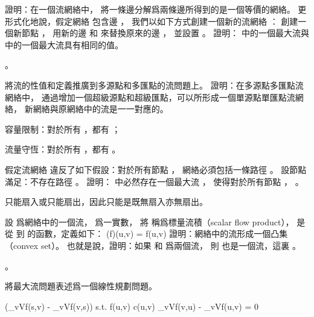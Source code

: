 \startsection[
  title={Flow networks},
  reference=section:flow_networks,
]

\startEXERCISE
證明：在一個流網絡中，
將一條邊分解爲兩條邊所得到的是一個等價的網絡。
更形式化地說，假定網絡  包含邊 ，
我們以如下方式創建一個新的流網絡 ：
創建一個新節點 ，
用新的邊  和  來替換原來的邊 ，
並設置 。
證明：  中的一個最大流與  中的一個最大流具有相同的值。
\stopEXERCISE

\startANSWER
{}。
\stopANSWER

\startEXERCISE
將流的性值和定義推廣到多源點和多匯點的流問題上。
證明：在多源點多匯點流網絡中，
通過增加一個超級源點和超級匯點，可以所形成一個單源點單匯點流網絡，
新網絡與原網絡中的流是一一對應的。
\stopEXERCISE

\startANSWER
容量限制：對於所有 ，都有 ；

流量守恆：對於所有 ，都有 。
\stopANSWER

\startEXERCISE
假定流網絡  違反了如下假設：對於所有節點 ，
網絡必須包括一條路徑 。
設節點  滿足：不存在路徑 。
證明：  中必然存在一個最大流 ，
使得對於所有節點 ， 。
\stopEXERCISE

\startANSWER
{} 只能扇入或只能扇出，因此只能是既無扇入亦無扇出。
\stopANSWER

\startEXERCISE
設  爲網絡中的一個流， \m{\alpha} 爲一實數，
將  稱爲{\EMP 標量流積（scalar flow product）}，
是從  到  的函數，定義如下：
\startformula
(\alpha f)(u,v) = \alpha \cdot f(u,v)
\stopformula
證明：網絡中的流形成一個{\EMP 凸集（convex set）}。
也就是說，證明：如果  和  爲兩個流，
則  也是一個流，這裏 。
\stopEXERCISE

\startANSWER
{}。
\stopANSWER

\startEXERCISE
將最大流問題表述爲一個線性規劃問題。
\stopEXERCISE

\startANSWER
\startformula\startmathalignment
\NC \max \NC (\sum_{v\in V}f(s,v) - \sum_{v\in V}f(v,s)) \NR
\NC s.t. \le f(u,v) \le c(u,v) \NR
\NC \NC \sum_{v\in V}f(v,u) - \sum_{v\in V}f(u,v) = 0 \NR
\stopmathalignment\stopformula
\stopANSWER

